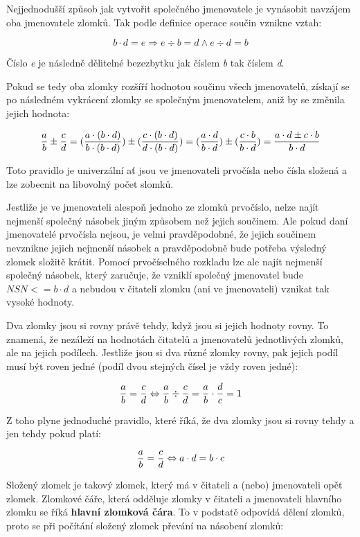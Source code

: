 Nejjednodušší způsob jak vytvořit společného jmenovatele je vynásobit navzájem oba jmenovatele zlomků. Tak podle definice operace součin vznikne vztah:

$$ b \cdot d = e \Rightarrow e \div b = d \wedge e \div d = b $$

Číslo {\it e} je následně dělitelné bezezbytku jak číslem {\it b} tak číslem {\it d}.

Pokud se tedy oba zlomky rozšíří hodnotou součinu všech jmenovatelů, získají se po následném vykrácení zlomky se společným jmenovatelem, aniž by se změnila jejich hodnota:

$$ {a \over b} \pm {c \over d} = ({a \cdot (b \cdot d) \over b \cdot (b\cdot d)}) \pm ({c \cdot (b \cdot d) \over d \cdot (b \cdot d)}) =  ({a\cdot d \over b \cdot d}) \pm ({c\cdot b \over b\cdot d})={a \cdot d \pm c \cdot b \over b \cdot d}$$

Toto pravidlo je univerzální ať jsou ve jmenovateli prvočísla nebo čísla složená a lze zobecnit na libovolný počet slomků.

Jestliže je ve jmenovateli alespoň jednoho ze zlomků prvočíslo, nelze najít nejmenší společný násobek jiným způsobem než jejich součinem. Ale pokud daní jmenovatelé prvočísla nejsou, je velmi pravděpodobné, že jejich součinem nevznikne jejich nejmenší násobek a pravděpodobně bude potřeba výsledný zlomek složitě krátit. Pomocí prvočíselného rozkladu lze ale najít nejmenší společný násobek, který zaručuje, že vzniklí společný jmenovatel bude $NSN <= b\cdot d$ a nebudou v čitateli zlomku (ani ve jmenovateli) vznikat tak vysoké hodnoty.


Dva zlomky jsou si rovny právě tehdy, když jsou si jejich hodnoty rovny. To znamená, že nezáleží na hodnotách čitatelů a jmenovatelů jednotlivých zlomků, ale na jejich podílech. Jestliže jsou si dva různé zlomky rovny, pak jejich podíl musí být roven jedné (podíl dvou stejných čísel je vždy roven jedné):

$$ {a \over b} = {c \over d} \Leftrightarrow  {a \over b} \div {c \over d} = {a \over b} \cdot {d \over c} = 1 $$

Z toho plyne jednoduché pravidlo, které říká, že dva zlomky jsou si rovny tehdy a jen tehdy pokud platí:

$$ {a \over b} = {c \over d} \Leftrightarrow a\cdot d = b \cdot c $$


Složený zlomek je takový zlomek, který má v čitateli a (nebo) jmenovateli opět zlomek. Zlomkové čáře, která odděluje zlomky v čitateli a jmenovateli  hlavního zlomku se říká {\bf hlavní zlomková čára}. To v podstatě odpovídá dělení zlomků, proto se při počítání složený zlomek převání na násobení zlomků:

